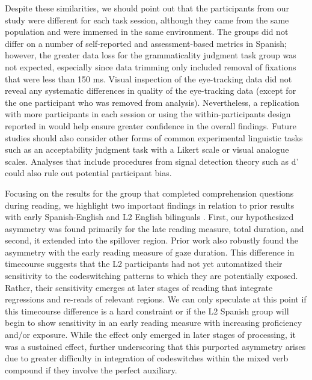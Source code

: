\documentclass[output=paper,colorlinks,citecolor=brown]{langscibook}
\begin{document}
Despite these similarities, we should point out that the participants from our study were different for each task session, although they came from the same population and were immersed in the same environment. The groups did not differ on a number of self-reported and assessment-based metrics in Spanish; however, the greater data loss for the grammaticality judgment task group was not expected, especially since data trimming only included removal of fixations that were less than 150 ms. Visual inspection of the eye-tracking data did not reveal any systematic differences in quality of the eye-tracking data (except for the one participant who was removed from analysis). Nevertheless, a replication with more participants in each session or using the within-participants design reported in \citet{ValdesKroffetal2018} would help ensure greater confidence in the overall findings. Future studies should also consider other forms of common experimental linguistic tasks such as an acceptability judgment task with a Likert scale or visual analogue scales. Analyses that include procedures from signal detection theory such as d’ could also rule out potential participant bias.

Focusing on the results for the group that completed comprehension questions during reading, we highlight two important findings in relation to prior results with early Spanish-English and L2 English bilinguals \citep{Guzzardo2013,GuzzardoTamargoetal2016}. First, our hypothesized asymmetry was found primarily for the late reading measure, total duration, and second, it extended into the spillover region. Prior work also robustly found the asymmetry with the early reading measure of gaze duration. This difference in timecourse suggests that the L2 participants had not yet automatized their sensitivity to the codeswitching patterns to which they are potentially exposed. Rather, their sensitivity emerges at later stages of reading that integrate regressions and re-reads of relevant regions. We can only speculate at this point if this timecourse difference is a hard constraint or if the L2 Spanish group will begin to show sensitivity in an early reading measure with increasing proficiency and/or exposure. While the effect only emerged in later stages of processing, it was a sustained effect, further underscoring that this purported asymmetry arises due to greater difficulty in integration of codeswitches within the mixed verb compound if they involve the perfect auxiliary.
\end{document}
